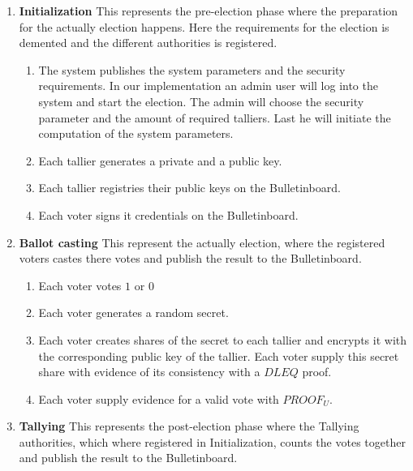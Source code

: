 \noindent
\begin{enumerate}
    \item \textbf{Initialization}
    This represents the pre-election phase where the preparation for the actually election happens. Here the requirements for the election is demented and the different authorities is registered. 
    
        \begin{enumerate}
            \item The system publishes the system parameters and the security requirements. In our implementation an admin user will log into the system and start the election. The admin will choose the security parameter and the amount of required talliers. Last he will initiate the computation of the system parameters.
            
            \item Each tallier generates a private and a public key.
            
            \item Each tallier registries their public keys on the Bulletinboard.
            
            \item Each voter signs it credentials on the Bulletinboard.
        \end{enumerate}
        
    \item \textbf{Ballot casting}
    This represent the actually election, where the registered voters castes there votes and publish the result to the Bulletinboard. 
    
        \begin{enumerate}
            \item Each voter votes $1$ or $0$
        
            \item Each voter generates a random secret.
        
            \item Each voter creates shares of the secret to each tallier and encrypts it with the corresponding public key of the tallier. Each voter supply this secret share with evidence of its consistency with a $DLEQ$ proof.
        
            \item Each voter supply evidence for a valid vote with $PROOF_U$.
        \end{enumerate}
        
    \item \textbf{Tallying} 
    This represents the post-election phase where the Tallying authorities, which where registered in Initialization, counts the votes together and publish the result to the Bulletinboard.
    

\end{enumerate}
